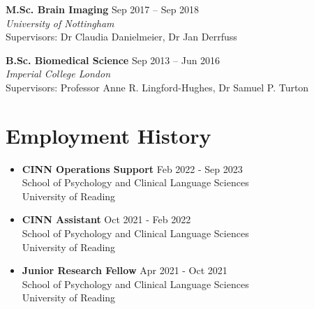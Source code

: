 \documentclass[a4paper,10pt]{article}
\makeatletter
\newcommand{\resumeItem}[1]{
  \item\small{
    {#1 \vspace{-2pt}}
  }
}
\newcommand{\resumeSubheading}[4]{
  \vspace{-0pt}\item
  \begin{minipage}{\textwidth}
    \textbf{#1} \hfill #2 \\
    #3 \\
    #4
  \end{minipage}\vspace{-7pt}
}
\newcommand{\resumeSubSubheading}[2]{
    \item
    \begin{tabular*}{0.97\textwidth}{l@{\extracolsep{\fill}}r}
      \textit{\small#1} & \textit{\small #2} \\
    \end{tabular*}\vspace{-7pt}
}
\newcommand{\resumeSubHeadingListStart}{\begin{itemize}[left=-0.06in, label={}, itemsep=-5pt]}
\newcommand{\resumeSubHeadingListEnd}{\end{itemize}}
\newcommand{\resumeItemListStart}{\begin{itemize}}
\newcommand{\resumeItemListEnd}{\end{itemize}\vspace{-5pt}}
\makeatother
\begin{document}
\begin{adjustwidth}{0em}{0pt}
\textbf{M.Sc. Brain Imaging} \hfill{Sep 2017 -- Sep 2018} \\
\emph{University of Nottingham} \\
Supervisors: Dr Claudia Danielmeier, Dr Jan Derrfuss
\end{adjustwidth}

\vspace{8pt}

\begin{adjustwidth}{0em}{0pt}
\textbf{B.Sc. Biomedical Science} \hfill{Sep 2013 -- Jun 2016} \\
\emph{Imperial College London} \\
Supervisors: Professor Anne R. Lingford-Hughes, Dr Samuel P. Turton
\end{adjustwidth}



\section{Employment History}
\vspace{2pt}
  \resumeSubHeadingListStart
\resumeSubheading
  {CINN Operations Support}{Feb 2022 - Sep 2023}{School of Psychology and Clinical Language Sciences}{University of Reading}
\vspace{8pt} 
\resumeSubheading
  {CINN Assistant}{Oct 2021 - Feb 2022}{School of Psychology and Clinical Language Sciences}{University of Reading}
\vspace{8pt} 
\resumeSubheading
  {Junior Research Fellow}{Apr 2021 - Oct 2021}{School of Psychology and Clinical Language Sciences}{University of Reading}
\vspace{4pt} 
  \resumeSubHeadingListEnd
  
\end{document}
